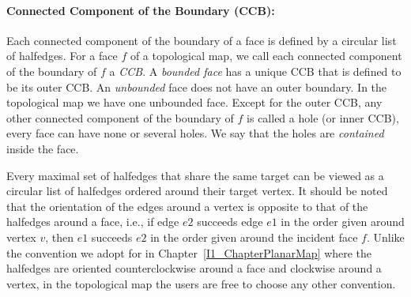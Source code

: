 

\paragraph{Connected Component of the Boundary (CCB):}
Each connected component of the boundary of a face is %
defined by a
circular list of halfedges. 
For a face $f$ of a topological map, 
we call each
connected component of the boundary of $f$ a {\em CCB}.
A {\em bounded face} has a
unique CCB that is defined to be
its outer CCB. An
{\em unbounded\/} face does not have an outer boundary.
In the topological map we have one unbounded face.
Except for the outer CCB, any other
connected component of the boundary of $f$ is called a hole (or inner CCB),
every face can have none
or several holes.
We say that the holes are {\em contained\/} inside
the face.

Every maximal set of halfedges that share the same target can be viewed 
as a circular list of halfedges ordered %
around their target vertex.
It should be noted that the orientation of the edges around a vertex is 
opposite to that of the halfedges around a face, i.e., if edge $e2$
succeeds edge $e1$ in the order given around vertex $v$, then $e1$
succeeds $e2$ in the order given around the incident face $f$.
Unlike the convention we adopt
for  in Chapter~\ref{I1_ChapterPlanarMap} where the halfedges
are oriented counterclockwise around a face and clockwise around a vertex,
in the topological map the users are free to choose any other convention.

